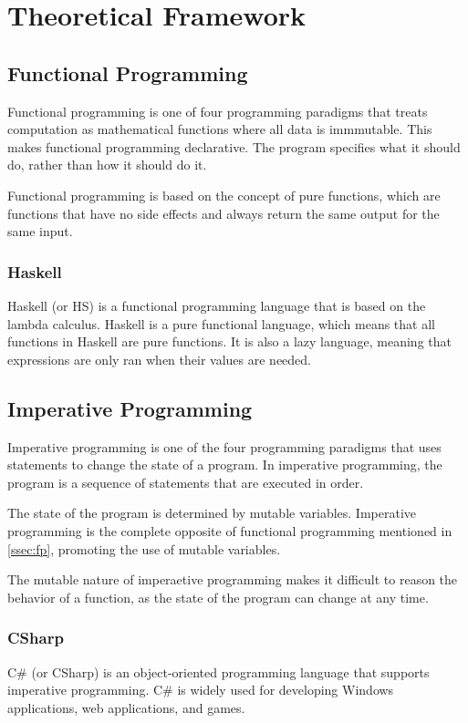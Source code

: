 \section{Theoretical Framework}

\subsection{Functional Programming}
\label{ssec:fp}
Functional programming is one of four programming paradigms that treats computation as mathematical
functions where all data is immmutable.\cite{hudak1989conception} This makes functional programming
declarative. The program specifies what it should do, rather than how it should do it.

Functional programming is based on the concept of pure functions, which are functions
that have no side effects and always return the same output for the same input.

\subsubsection*{Haskell}
Haskell (or HS) is a functional programming language that is based on the lambda calculus.\cite{hutton2016programming}
Haskell is a pure functional language, which means that all functions in Haskell are pure functions.
It is also a lazy language, meaning that expressions are only ran when their values are needed.

\subsection{Imperative Programming}

Imperative programming is one of the four programming paradigms that uses statements to change
the state of a program. In imperative programming, the program is a sequence of statements that
are executed in order.\cite{syme2007introducing}

The state of the program is determined by mutable variables. Imperative programming is the
complete opposite of functional programming mentioned in \autoref{ssec:fp},
promoting the use of mutable variables.

The mutable nature of imperaetive programming makes it difficult to reason the behavior of
a function, as the state of the program can change at any time.

\subsubsection*{CSharp}
C\# (or CSharp) is an object-oriented programming language that supports imperative programming.
C\# is widely used for developing Windows applications, web applications, and games.

